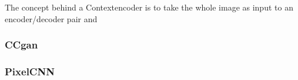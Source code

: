 	The concept behind a Contextencoder is to take the whole image as input to an encoder/decoder pair and 
	
	
	
      \subsubsection{CCgan}
      \subsubsection{PixelCNN}
      
  
 
